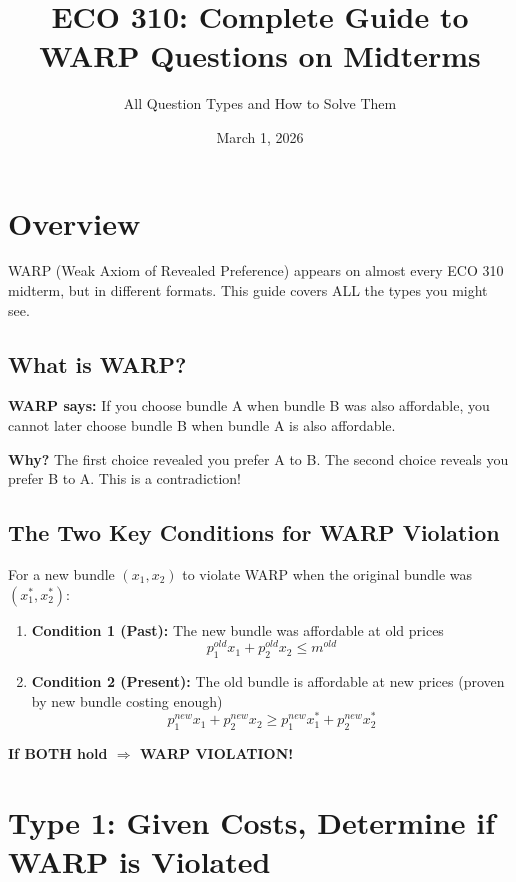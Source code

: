 \documentclass[11pt]{article}
\title{ECO 310: Complete Guide to WARP Questions on Midterms}
\author{All Question Types and How to Solve Them}
\date{March 1, 2026}
\begin{document}
\maketitle

\tableofcontents

\newpage

\section{Overview}

WARP (Weak Axiom of Revealed Preference) appears on almost every ECO 310 midterm, but in different formats. This guide covers ALL the types you might see.

\subsection{What is WARP?}

\textbf{WARP says:} If you choose bundle A when bundle B was also affordable, you cannot later choose bundle B when bundle A is also affordable.

\textbf{Why?} The first choice revealed you prefer A to B. The second choice reveals you prefer B to A. This is a contradiction!

\subsection{The Two Key Conditions for WARP Violation}

For a new bundle $(x_1, x_2)$ to violate WARP when the original bundle was $(x_1^*, x_2^*)$:

\begin{enumerate}
\item \textbf{Condition 1 (Past):} The new bundle was affordable at old prices
\[
p_1^{old} x_1 + p_2^{old} x_2 \leq m^{old}
\]

\item \textbf{Condition 2 (Present):} The old bundle is affordable at new prices (proven by new bundle costing enough)
\[
p_1^{new} x_1 + p_2^{new} x_2 \geq p_1^{new} x_1^* + p_2^{new} x_2^*
\]
\end{enumerate}

\textbf{If BOTH hold $\Rightarrow$ WARP VIOLATION!}

\newpage

\section{Type 1: Given Costs, Determine if WARP is Violated}
\end{document}
